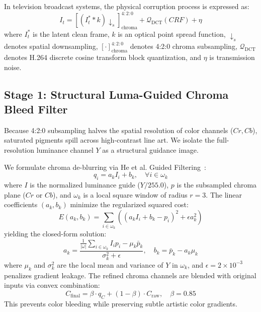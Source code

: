 \documentclass[conference]{IEEEtran}
\begin{document}
In television broadcast systems, the physical corruption process is expressed as:
\begin{equation}
I_t = \left[ (I^*_{t} * k) \downarrow_s \right]_{\text{chroma}}^{4:2:0} + \mathcal{Q}_{\text{DCT}}(CRF) + \eta
\end{equation}
where $I^*_t$ is the latent clean frame, $k$ is an optical point spread function, $\downarrow_s$ denotes spatial downsampling, $[\cdot]_{\text{chroma}}^{4:2:0}$ denotes 4:2:0 chroma subsampling, $\mathcal{Q}_{\text{DCT}}$ denotes H.264 discrete cosine transform block quantization, and $\eta$ is transmission noise.

\subsection{Stage 1: Structural Luma-Guided Chroma Bleed Filter}
Because 4:2:0 subsampling halves the spatial resolution of color channels ($Cr, Cb$), saturated pigments spill across high-contrast line art. We isolate the full-resolution luminance channel $Y$ as a structural guidance image.

We formulate chroma de-blurring via He et al. Guided Filtering~\cite{he2010guided}:
\begin{equation}
q_i = a_k I_i + b_k, \quad \forall i \in \omega_k
\end{equation}
where $I$ is the normalized luminance guide ($Y / 255.0$), $p$ is the subsampled chroma plane ($Cr$ or $Cb$), and $\omega_k$ is a local square window of radius $r = 3$. The linear coefficients $(a_k, b_k)$ minimize the regularized squared cost:
\begin{equation}
E(a_k, b_k) = \sum_{i \in \omega_k} \left( (a_k I_i + b_k - p_i)^2 + \epsilon a_k^2 \right)
\end{equation}
yielding the closed-form solution:
\begin{equation}
a_k = \frac{\frac{1}{|\omega|} \sum_{i \in \omega_k} I_i p_i - \mu_k \bar{p}_k}{\sigma_k^2 + \epsilon}, \quad b_k = \bar{p}_k - a_k \mu_k
\end{equation}
where $\mu_k$ and $\sigma_k^2$ are the local mean and variance of $Y$ in $\omega_k$, and $\epsilon = 2 \times 10^{-3}$ penalizes gradient leakage. The refined chroma channels are blended with original inputs via convex combination:
\begin{equation}
C_{\text{final}} = \beta \cdot q_C + (1 - \beta) \cdot C_{\text{raw}}, \quad \beta = 0.85
\end{equation}
This prevents color bleeding while preserving subtle artistic color gradients.
\end{document}
